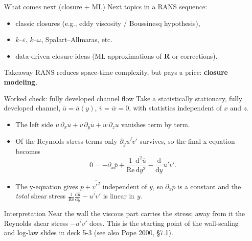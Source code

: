 \documentclass[aspectratio=169,11pt]{beamer}
\newcommand{\Rey}{\mathrm{Re}}
\newcommand{\avg}[1]{\overline{#1}}
\begin{document}
\begin{frame}{What comes next (closure + ML)}
Next topics in a RANS sequence:
\begin{itemize}
  \item classic closures (e.g., eddy viscosity / Boussinesq hypothesis),
  \item $k$--$\varepsilon$, $k$--$\omega$, Spalart--Allmaras, etc.
  \item data-driven closure ideas (ML approximations of $\bm{R}$ or corrections).
\end{itemize}

\begin{block}{Takeaway}
RANS reduces space-time complexity, but pays a price: \textbf{closure modeling}.
\end{block}
\end{frame}

\begin{frame}{Worked check: fully developed channel flow}
Take a statistically stationary, fully developed channel, $\avg{u}=\avg{u}(y)$, $\avg{v}=\avg{w}=0$, with statistics independent of $x$ and $z$.
\begin{itemize}
  \item The left side $\avg{u}\,\partial_x\avg{u}+\avg{v}\,\partial_y\avg{u}+\avg{w}\,\partial_z\avg{u}$ vanishes term by term.
  \item Of the Reynolds-stress terms only $\partial_y\avg{u'v'}$ survives, so the final x-equation becomes
  \[
    0=-\partial_x\avg{p}+\frac1{\Rey}\frac{\mathrm d^2\avg{u}}{\mathrm dy^2}-\frac{\mathrm d}{\mathrm dy}\avg{u'v'}.
  \]
  \item The y-equation gives $\avg{p}+\avg{v'^2}$ independent of $y$, so $\partial_x\avg{p}$ is a constant and the \emph{total} shear stress
  $\frac1{\Rey}\frac{\mathrm d\avg{u}}{\mathrm dy}-\avg{u'v'}$ is linear in $y$.
\end{itemize}
\begin{block}{Interpretation}
Near the wall the viscous part carries the stress; away from it the Reynolds shear stress $-\avg{u'v'}$ does. This is the starting point of the wall-scaling and log-law slides in deck 5-3 (see also Pope 2000, \S7.1).
\end{block}
\end{frame}
\end{document}
